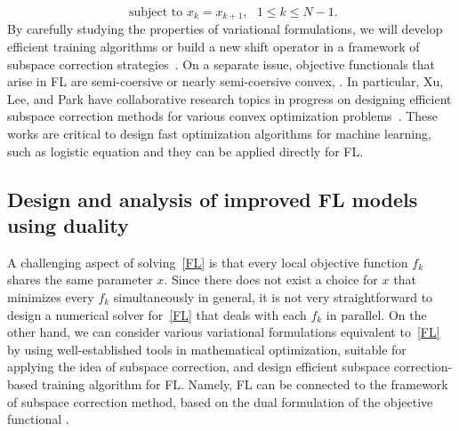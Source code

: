 \begin{itemize}
\begin{equation*}
    \textrm{ subject to } x_k = x_{k+1}, \textrm{ } 1 \leq k \leq N-1.
\end{equation*} 
By carefully studying the properties of variational formulations, we will develop efficient training algorithms or build a new shift operator in a framework of subspace correction strategies~\cite{Park:2020,Park:2021,Park:2022,Xu:1992,LWXZ:2007,LWXZ:2008}. On a separate issue, objective functionals that arise in FL are semi-coersive or nearly semi-coersive convex, \cite{lee2009robust,LWXZ:2007,hong2016uniformly,hong2016robust,chen2020robust}. In particular, Xu, Lee, and Park have collaborative research topics in progress on designing efficient subspace correction methods for various convex optimization problems~\cite{LPX:un2,LPX:un1}. These works are critical to design fast optimization algorithms for machine learning, such as logistic equation and they can be applied directly for FL.  

\subsection{Design and analysis of improved FL models using duality} 

A challenging aspect of solving~\cref{FL} is that every local objective function $f_k$ shares the same parameter $x$. Since there does not exist a choice for $x$ that minimizes every $f_k$ simultaneously in general, it is not very straightforward to design a numerical solver for~\cref{FL} that deals with each $f_k$ in parallel. On the other hand, we can consider various variational formulations equivalent to~\cref{FL} by using well-established tools in mathematical optimization, suitable for applying the idea of subspace correction, and design efficient subspace correction-based training algorithm for FL. Namely, FL can be connected to the framework of subspace correction method, based on the dual formulation of the objective functional \cite{zhang2002dual}. 


\end{itemize}
